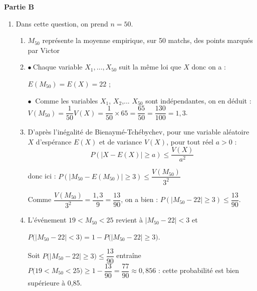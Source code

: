 \documentclass[10pt]{article}
\begin{document}
\medskip

\textbf{Partie B}

\medskip



















\begin{enumerate}
\item Dans cette question, on prend $n = 50$.

	\begin{enumerate}
		\item 
$M_{50}$ représente la moyenne empirique, sur 50 matchs, des points marqués par Victor
		\item 
$\bullet~$Chaque variable $X_1,\ldots, X_{50}$ suit la même loi que $X$ donc on a :

{$E(M_{50}) = E (X) = 22$ ;}

$\bullet~$ Comme les variables $X_1$, $X_2$,... $X_50$ sont indépendantes, on en déduit : \quad $V(M_{50}) = \dfrac{1}{50}V(X) = \dfrac{1}{50} \times 65 = \dfrac{65}{50} = \dfrac{130}{100} = 1,3$.

		\item 
D'après l'inégalité de Bienaymé-Tchébychev, pour une variable aléatoire $X$  d’espérance $E(X)$ et de variance $V (X)$,  pour tout réel $a > 0$ :
		$$P(|X - E(X)|\geqslant a) \leqslant \dfrac{V(X)}{a^2}$$

donc  ici  : $P(|M_{50} - E(M_{50})| \geqslant 3) \leqslant \dfrac{V(M_{50})}{3^2}$



Comme $\dfrac{V(M_{50})}{3^2} = \dfrac{1,3}{9} = \dfrac{13}{90}$, on a bien  :  $P\left(\left|M_{50}- 22\right| \geqslant 3\right) \leqslant \dfrac{13}{90}$.



		\item 
		L'événement \og  $19 <M_{50}< 25$ \fg{} revient à $\left|M_{50} - 22 \right| < 3$ et

$P\big(\left|M_{50} - 22 \right| < 3\big) = 1 - P\big(\left|M_{50} - 22 \right| \geqslant 3\big)$.

Soit $P\big(\left|M_{50} - 22 \right| \geqslant 3\big) \leqslant \dfrac{13}{90}$ entraîne $P\big(19 < M_{50} < 25 \big) \geqslant 1 - \dfrac{13}{90} = \dfrac{77}{90} \approx 0,856$ : cette probabilité est bien supérieure à 0,85.
	\end{enumerate}



\end{enumerate}
\end{document}
